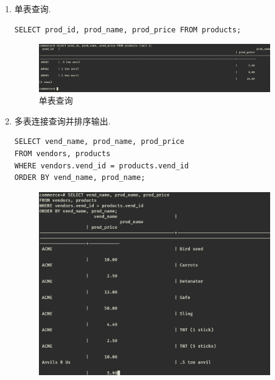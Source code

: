 \begin{enumerate}
  \item 单表查询.
\begin{center}
\begin{verbatim}
SELECT prod_id, prod_name, prod_price FROM products;
\end{verbatim}
\end{center}
\begin{figure}[H]
  \begin{center}
    \includegraphics[width=0.95\textwidth,scale=0.5]{./figures/single_select.png}
  \end{center}
  \caption{单表查询}
\end{figure}
  \item 多表连接查询并排序输出.
\begin{center}
\begin{verbatim}
SELECT vend_name, prod_name, prod_price
FROM vendors, products
WHERE vendors.vend_id = products.vend_id
ORDER BY vend_name, prod_name;
\end{verbatim}
\end{center}
\begin{figure}[H]
  \begin{center}
    \includegraphics[width=0.95\textwidth,scale=0.5]{./figures/multiple_select.png}

\end{center}
\end{figure}
\end{enumerate}

